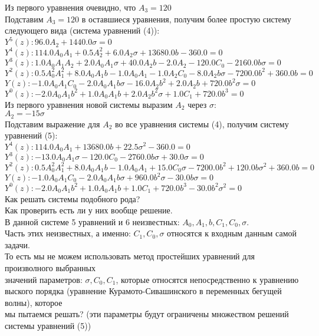 \documentclass[12pt,a4paper,draft]{letter}
\begin{document}
Из первого уравнения очевидно, что $A_3 = 120$ \\
Подставим $A_3 = 120$ в оставшиеся уравнения, получим более простую систему следующего вида (система уравнений (4)): \\
$Y^5(z): 96.0 A_2 + 1440.0 \sigma = 0$\\
$Y^4(z): 114.0 A_0 A_1 + 0.5 A_2^2 + 6.0 A_2 \sigma + 13680.0 b - 360.0 = 0$\\
$Y^3(z): 1.0 A_0 A_1 A_2 + 2.0 A_0 A_1 \sigma + 40.0 A_2 b - 2.0 A_2 - 120.0 C_0 - 2160.0 b \sigma = 0$\\
$Y^2(z): 0.5 A_0^2 A_1^2 + 8.0 A_0 A_1 b - 1.0 A_0 A_1 - 1.0 A_2 C_0 - 8.0 A_2 b \sigma - 7200.0 b^2 + 360.0 b = 0$\\
$Y(z): -1.0 A_0 A_1 C_0 - 2.0 A_0 A_1 b \sigma - 16.0 A_2 b^2 + 2.0 A_2 b + 720.0 b^2 \sigma = 0$\\
$Y^0(z): -2.0 A_0 A_1 b^2 + 1.0 A_0 A_1 b + 2.0 A_2 b^2 \sigma + 1.0 C_1 + 720.0 b^3 = 0$\\
Из первого уравнения новой системы выразим $A_2$ через $\sigma$:\\
$A_2 = -15 \sigma$\\
Подставим выражение для $A_2$ во все уравнения системы (4), получим систему уравнений (5):\\
$Y^4(z): 114.0 A_0 A_1 + 13680.0 b + 22.5 \sigma^2 - 360.0 = 0$\\
$Y^3(z): -13.0 A_0 A_1 \sigma - 120.0 C_0 - 2760.0 b \sigma + 30.0 \sigma = 0$\\
$Y^2(z): 0.5 A_0^2 A_1^2 + 8.0 A_0 A_1 b - 1.0 A_0 A_1 + 15.0 C_0 \sigma - 7200.0 b^2 + 120.0 b \sigma^2 + 360.0 b = 0$\\
$Y(z): -1.0 A_0 A_1 C_0 - 2.0 A_0 A_1 b \sigma + 960.0 b^2 \sigma - 30.0 b \sigma = 0$\\
$Y^0(z): -2.0 A_0 A_1 b^2 + 1.0 A_0 A_1 b + 1.0 C_1 + 720.0 b^3 - 30.0 b^2 \sigma^2 = 0$\\
Как решать системы подобного рода?\\
Как проверить есть ли у них вообще решение.\\
В данной системе 5 уравнений и 6 неизвестных: $A_0, A_1, b, C_1, C_0, \sigma$.\\
Часть этих неизвестных, а именно: $C_1, C_0, \sigma$ относятся к входным данным самой задачи.\\
То есть мы не можем использовать метод простейших уравнений для произволного выбранных\\
значений параметров: $\sigma, C_0, C_1$, которые относятся непосредственно к уравнению\\
выского порядка (уравнение Курамото-Сивашинского в переменных бегущей волны), которое\\
мы пытаемся решать? (эти параметры будут ограничены множеством решений системы уравнений (5))\\     
\end{document}
